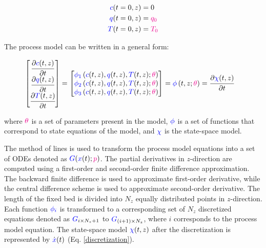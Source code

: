 \documentclass[../Article_Model_Parameters.tex]{subfiles}
\begin{document}
			{\footnotesize
				\begin{subequations}
					\begin{align*}
						{\color{blue}c}(t = 0, z) &= 0   \\
						{\color{blue}q}(t = 0, z) &= {\color{magenta}q_0} \\
						{\color{blue}T}(t = 0, z) &= {\color{magenta}T_0}
					\end{align*}
			\end{subequations} }
			
			The process model can be written in a general form:
			
			{\footnotesize
				\begin{align}
					\begin{bmatrix}
						\cfrac{\partial {\color{blue}c}(t,z)}{\partial t}\\
						\cfrac{\partial {\color{blue}q}(t,z)}{\partial t}\\
						\cfrac{\partial {\color{blue}T}(t,z)}{\partial t} 
					\end{bmatrix}
					& =
					\begin{bmatrix}
						{\color{blue}\phi_1} \left( {\color{blue}c}(t,z),{\color{blue}q}(t,z),{\color{blue}T}(t,z); {\color{magenta}\theta} \right)\\
						{\color{blue}\phi_2} \left( {\color{blue}c}(t,z),{\color{blue}q}(t,z),{\color{blue}T}(t,z); {\color{magenta}\theta} \right)\\
						{\color{blue}\phi_3} \left( {\color{blue}c}(t,z),{\color{blue}q}(t,z),{\color{blue}T}(t,z); {\color{magenta}\theta} \right)
					\end{bmatrix} = {\color{blue}\phi} \left( t,z; {\color{magenta}\theta} \right) = \cfrac{\partial {\color{blue}\chi}(t,z)}{\partial t}
			\end{align} }
			
			where ${\color{magenta}\theta}$ is a set of parameters present in the model, ${\color{blue}\phi}$ is a set of functions that correspond to state equations of the model, and ${\color{blue}\chi}$ is the state-space model.
			
			The method of lines is used to transform the process model equations into a set of ODEs denoted as ${\color{blue}G}({\color{blue}x}(t);{\color{magenta}p})$. The partial derivatives in $z$-direction are computed using a first-order and second-order finite difference approximation. The backward finite difference is used to approximate first-order derivative, while the central difference scheme is used to approximate second-order derivative. The length of the fixed bed is divided into $N_z$ equally distributed points in $z$-direction. Each function ${\color{blue}\phi_i}$ is transformed to a corresponding set of $N_z$ discretized equations denoted as ${\color{blue}G}_{i\times N_z+1}$ to ${\color{blue}G}_{(i+1)\times N_z}$, where $i$ corresponds to the process model equation. The state-space model ${\color{blue}\chi}(t,z)$ after the discretization is represented by $\dot{{\color{blue}x}}(t)$ (Eq.  \ref{discretization}).
			
\end{document}
